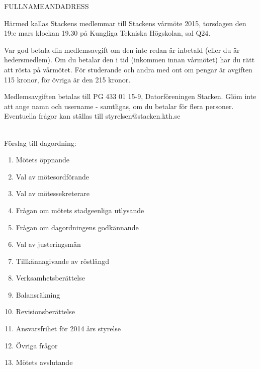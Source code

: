 \documentclass[fontsize=11pt,enlargefirstpage,firstfoot=false,a4paper,pagenumber=no]{scrlttr2}
\begin{document}
 
\begin{letter}{FULLNAMEANDADRESS}

\opening{Härmed kallas Stackens medlemmar till Stackens vårmöte 2015, torsdagen den 19:e mars klockan 19.30 på Kungliga Tekniska Högskolan, sal Q24.}

Var god betala din medlemsavgift om den inte redan är inbetald (eller du är hedersmedlem). Om du betalar den i tid (inkommen innan vårmötet) har du rätt att rösta på vårmötet. För studerande och andra med ont om pengar är avgiften 115 kronor, för övriga är den 215 kronor.

Medlemsavgiften betalas till PG 433 01 15-9, Datorföreningen Stacken. Glöm inte att ange namn och username - samtligas, om du betalar för flera personer. Eventuella frågor kan ställas till styrelsen@stacken.kth.se

~\\
Förslag till dagordning:

\begin{multicols}{2}
\begin{enumerate}
	\itemsep0em
	\item  Mötets öppnande
	\item  Val av mötesordförande
	\item  Val av mötessekreterare
	\item  Frågan om mötets stadgeenliga utlysande
	\item  Frågan om dagordningens godkännande
	\item  Val av justeringsmän
	\item  Tillkännagivande av röstlängd
	\item  Verksamhetsberättelse
	\item  Balansräkning
	\item  Revisionsberättelse
	\item  Ansvarsfrihet för 2014 års styrelse
	\item  Övriga frågor
	\item  Mötets avslutande
\end{enumerate}
\end{multicols}

\closing{}
\enlargethispage{3\baselineskip}

\end{letter}
\end{document}
